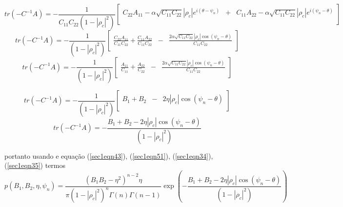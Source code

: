\documentclass[10pt,a4paper]{article}
\begin{document}
{\footnotesize
\begin{equation}\label{sec1eqn47}
	tr(-C^{-1}A)=-\frac{1}{C_{11}C_{22}(1-\left|\rho_c\right|^2)}\left[
\begin{array}{ccc}
	C_{22}A_{11}-\alpha \sqrt{C_{11}C_{22}}\left|\rho_c \right|e^{i(\theta-\psi_n)} &+& C_{11}A_{22}-\alpha \sqrt{C_{11}C_{22}}\left|\rho_c \right|e^{i(\psi_n-\theta)}\\
\end{array}\right]
\end{equation}}
{\footnotesize
\begin{equation}\label{sec1eqn48}
	tr(-C^{-1}A)=-\frac{1}{(1-\left|\rho_c\right|^2)}\left[
\begin{array}{ccc}
	\frac{C_{22}A_{11}}{C_{11}C_{22}}+\frac{C_{11}A_{22}}{C_{11}C_{22}}&-&\frac{2\alpha \sqrt{C_{11}C_{22}}\left|\rho_c \right|\cos(\psi_n-\theta)}{C_{11}C_{22}}\\
\end{array}\right]
\end{equation}}
{\footnotesize
\begin{equation}\label{sec1eqn49}
	tr(-C^{-1}A)=-\frac{1}{(1-\left|\rho_c\right|^2)}\left[
\begin{array}{ccc}
	\frac{A_{11}}{C_{11}}+\frac{A_{22}}{C_{22}}&-&\frac{2\alpha \sqrt{C_{11}C_{22}}\left|\rho_c \right|\cos(\psi_n-\theta)}{C_{11}C_{22}}\\
\end{array}\right]
\end{equation}}

{\footnotesize
\begin{equation}\label{sec1eqn50}
	tr(-C^{-1}A)=-\frac{1}{(1-\left|\rho_c\right|^2)}\left[
\begin{array}{ccc}
	B_1+B_2&-&2\eta \left|\rho_c \right|\cos(\psi_n-\theta)\\
\end{array}\right]
\end{equation}}
{\footnotesize
\begin{equation}\label{sec1eqn51}
	tr(-C^{-1}A)=-\frac{B_1+B_2-2\eta \left|\rho_c \right|\cos(\psi_n-\theta)}{(1-\left|\rho_c\right|^2)}
\end{equation}}

portanto usando e equação (\ref{sec1eqn43}), (\ref{sec1eqn51}),   (\ref{sec1eqn34}), (\ref{sec1eqn35}) termos   
{\footnotesize
\begin{equation}\label{sec1eqn52}
	p(B_1,B_2,\eta,\psi_n)=\frac{\left(B_1B_2-\eta^2\right)^{n-2}\eta}{\pi(1-\left|\rho_c\right|^2)^{n}\Gamma(n)\Gamma(n-1)}\exp\left(-\frac{B_1+B_2-2\eta \left|\rho_c \right|\cos(\psi_n-\theta)}{(1-\left|\rho_c\right|^2)}\right)
\end{equation}}
\end{document}
